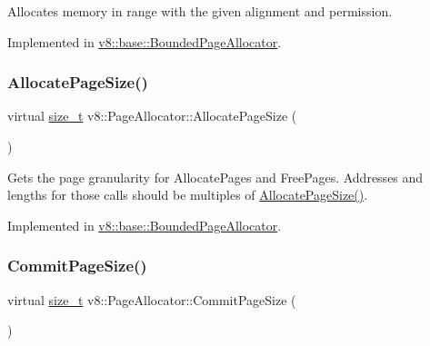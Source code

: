 Allocates memory in range with the given alignment and permission. 

Implemented in \mbox{\hyperlink{classv8_1_1base_1_1BoundedPageAllocator_a0de34af3c63e3a50ed6f8613720286b6}{v8\+::base\+::\+Bounded\+Page\+Allocator}}.

\mbox{\label{classv8_1_1PageAllocator_a92c2f6dbb3afa6c47dafd4c12ab4641f}} 
\subsubsection{\texorpdfstring{Allocate\+Page\+Size()}{AllocatePageSize()}}
{\footnotesize\ttfamily virtual \mbox{\hyperlink{classsize__t}{size\+\_\+t}} v8\+::\+Page\+Allocator\+::\+Allocate\+Page\+Size (\begin{DoxyParamCaption}{ }\end{DoxyParamCaption})\hspace{0.3cm}{\ttfamily [pure virtual]}}

Gets the page granularity for Allocate\+Pages and Free\+Pages. Addresses and lengths for those calls should be multiples of \mbox{\hyperlink{classv8_1_1PageAllocator_a92c2f6dbb3afa6c47dafd4c12ab4641f}{Allocate\+Page\+Size()}}. 

Implemented in \mbox{\hyperlink{classv8_1_1base_1_1BoundedPageAllocator_af7b999d6c3a3526636230bf6b7d72784}{v8\+::base\+::\+Bounded\+Page\+Allocator}}.

\mbox{\label{classv8_1_1PageAllocator_ad817d87004151e3824997415f2dc57e9}} 
\subsubsection{\texorpdfstring{Commit\+Page\+Size()}{CommitPageSize()}}
{\footnotesize\ttfamily virtual \mbox{\hyperlink{classsize__t}{size\+\_\+t}} v8\+::\+Page\+Allocator\+::\+Commit\+Page\+Size (\begin{DoxyParamCaption}{ }\end{DoxyParamCaption})\hspace{0.3cm}{\ttfamily [pure virtual]}}

